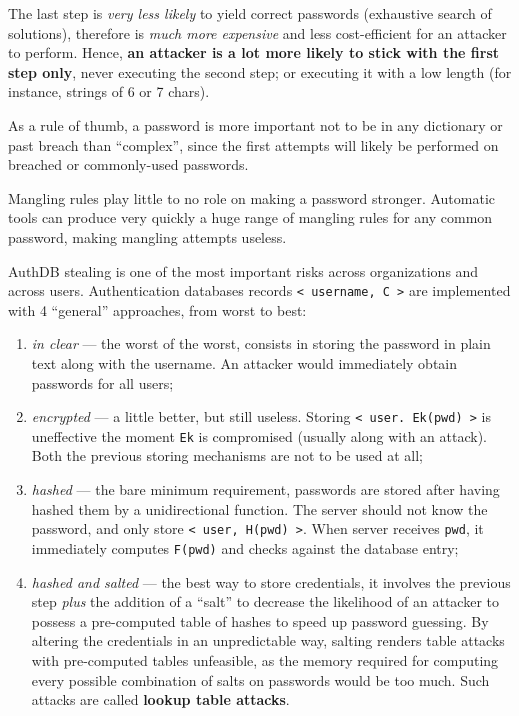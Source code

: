 \documentclass[10pt]{extreport}
\begin{document}
The last step is \emph{very less likely} to yield correct passwords (exhaustive
search of solutions), therefore is \emph{much more expensive} and less
cost\--efficient for an attacker to perform. Hence, \textbf{an attacker is a
lot more likely to stick with the first step only}, never executing the second
step; or executing it with a low length (for instance, strings of 6 or 7
chars).

As a rule of thumb, a password is more important not to be in any dictionary or
past breach than ``complex'', since the first attempts will likely be performed
on breached or commonly\--used passwords.

Mangling rules play little to no role on making a password stronger. Automatic
tools can produce very quickly a huge range of mangling rules for any common
password, making mangling attempts useless.

AuthDB stealing is one of the most important risks across organizations and
across users. Authentication databases records \texttt{< username, C >} are
implemented with 4 ``general'' approaches, from worst to best:
\begin{enumerate}
    \item \emph{in clear} --- the worst of the worst, consists in storing the
        password in plain text along with the username. An attacker would
        immediately obtain passwords for all users;
    \item \emph{encrypted} --- a little better, but still useless. Storing
        \texttt{< user. Ek(pwd) >} is uneffective the moment \texttt{Ek} is
        compromised (usually along with an attack). Both the previous storing
        mechanisms are not to be used at all;
    \item \emph{hashed} --- the bare minimum requirement, passwords are stored
        after having hashed them by a unidirectional function. The server
        should not know the password, and only store \texttt{< user, H(pwd) >}.
        When server receives \texttt{pwd}, it immediately computes
        \texttt{F(pwd)} and checks against the database entry;
    \item \emph{hashed and salted} --- the best way to store credentials, it
        involves the previous step \emph{plus} the addition of a ``salt'' to
        decrease the likelihood of an attacker to possess a pre\--computed
        table of hashes to speed up password guessing. By altering the
        credentials in an unpredictable way, salting renders table attacks with
        pre\--computed tables unfeasible, as the memory required for computing
        every possible combination of salts on passwords would be too much.
        Such attacks are called \textbf{lookup table attacks}.
\end{enumerate}
\end{document}
